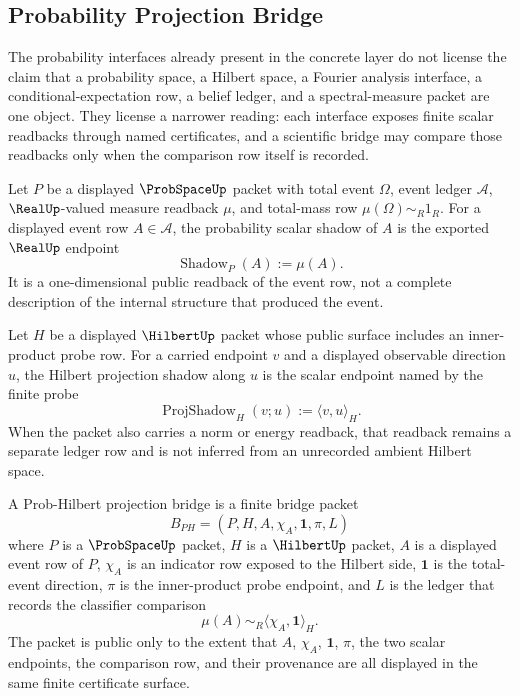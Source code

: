 \subsection{Probability Projection Bridge}
\label{subsec:philosophy-probability-projection-bridge}

The probability interfaces already present in the concrete layer do not
license the claim that a probability space, a Hilbert space, a Fourier
analysis interface, a conditional-expectation row, a belief ledger, and a
spectral-measure packet are one object. They license a narrower reading:
each interface exposes finite scalar readbacks through named certificates,
and a scientific bridge may compare those readbacks only when the comparison
row itself is recorded.

\begin{definition}
\label{def:philosophy-probability-scalar-shadow}
Let $P$ be a displayed $\ProbSpaceUp$ packet with total event $\Omega$,
event ledger $\mathcal A$, $\RealUp$-valued measure readback $\mu$, and
total-mass row $\mu(\Omega)\sim_R 1_R$. For a displayed event row
$A\in\mathcal A$, the probability scalar shadow of $A$ is the exported
$\RealUp$ endpoint
$$
\operatorname{Shadow}_{P}(A):=\mu(A).
$$
It is a one-dimensional public readback of the event row, not a complete
description of the internal structure that produced the event.
\end{definition}

\begin{definition}
\label{def:philosophy-hilbert-projection-shadow}
Let $H$ be a displayed $\HilbertUp$ packet whose public surface includes an
inner-product probe row. For a carried endpoint $v$ and a displayed observable
direction $u$, the Hilbert projection shadow along $u$ is the scalar endpoint
named by the finite probe
$$
\operatorname{ProjShadow}_{H}(v;u):=\langle v,u\rangle_H .
$$
When the packet also carries a norm or energy readback, that readback remains
a separate ledger row and is not inferred from an unrecorded ambient Hilbert
space.
\end{definition}

\begin{definition}
\label{def:philosophy-prob-hilbert-projection-bridge}
A Prob-Hilbert projection bridge is a finite bridge packet
$$
B_{PH}=(P,H,A,\chi_A,\mathbf 1,\pi,L)
$$
where $P$ is a $\ProbSpaceUp$ packet, $H$ is a $\HilbertUp$ packet,
$A$ is a displayed event row of $P$, $\chi_A$ is an indicator row exposed to
the Hilbert side, $\mathbf 1$ is the total-event direction, $\pi$ is the
inner-product probe endpoint, and $L$ is the ledger that records the
classifier comparison
$$
\mu(A)\sim_R\langle \chi_A,\mathbf 1\rangle_H .
$$
The packet is public only to the extent that $A$, $\chi_A$, $\mathbf 1$,
$\pi$, the two scalar endpoints, the comparison row, and their provenance
are all displayed in the same finite certificate surface.
\end{definition}

